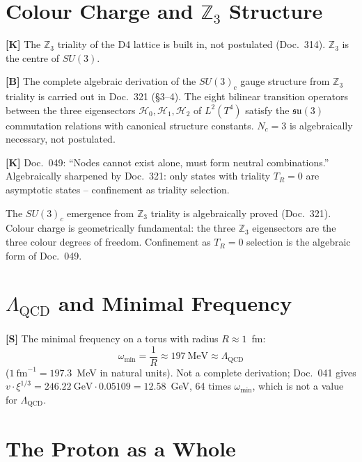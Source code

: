 \section{Colour Charge and $\mathbb{Z}_3$ Structure}

\textbf{[K]} The $\mathbb{Z}_3$ triality of the D4 lattice is built
in, not postulated (Doc.~314). $\mathbb{Z}_3$ is the centre of $SU(3)$.

\textbf{[B]} The complete algebraic derivation of the $SU(3)_c$
gauge structure from $\mathbb{Z}_3$ triality is carried out in
Doc.~321 (\S3--4). The eight bilinear transition operators between
the three eigensectors $\mathcal{H}_0, \mathcal{H}_1, \mathcal{H}_2$
of $L^2(T^4)$ satisfy the $\mathfrak{su}(3)$ commutation relations
with canonical structure constants. $N_c = 3$ is algebraically
necessary, not postulated.

\textbf{[K]} Doc.~049: ``Nodes cannot exist alone, must form neutral
combinations.'' Algebraically sharpened by Doc.~321: only states
with triality $T_R = 0$ are asymptotic states -- confinement as
triality selection.

\begin{tcolorbox}[colback=green!6!white,colframe=green!50!black,
  title=Status of the colour charge thesis -- closed by Doc.~321 \textbf{[B]}]
The $SU(3)_c$ emergence from $\mathbb{Z}_3$ triality is algebraically
proved (Doc.~321). Colour charge is geometrically fundamental:
the three $\mathbb{Z}_3$ eigensectors are the three colour degrees
of freedom. Confinement as $T_R=0$ selection is the algebraic form
of Doc.~049.
\end{tcolorbox}

\section{$\Lambda_{\text{QCD}}$ and Minimal Frequency}

\textbf{[S]} The minimal frequency on a torus with radius $R \approx 1$~fm:
\begin{equation}
  \omega_{\min} = \frac{1}{R} \approx 197~\text{MeV}
  \approx \Lambda_{\text{QCD}}
\end{equation}
($1~\text{fm}^{-1} = 197.3$~MeV in natural units). Not a complete
derivation; Doc.~041 gives $v\cdot\xi^{1/3} = 246.22~\text{GeV}\cdot
0.05109 = 12.58$~GeV, 64 times $\omega_{\min}$, which is not a value for
$\Lambda_{\text{QCD}}$.

\section{The Proton as a Whole}


